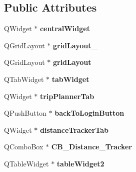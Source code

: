 \subsection*{Public Attributes}
\begin{DoxyCompactItemize}
\item 
\mbox{\label{class_ui___main_window_a30075506c2116c3ed4ff25e07ae75f81}} 
Q\+Widget $\ast$ {\bfseries central\+Widget}
\item 
\mbox{\label{class_ui___main_window_a6b2a0c5f7e8ff2a87134908dd770d2d2}} 
Q\+Grid\+Layout $\ast$ {\bfseries grid\+Layout\+\_}
\item 
\mbox{\label{class_ui___main_window_a525ed3c5fe0784ac502ee222fba4e205}} 
Q\+Grid\+Layout $\ast$ {\bfseries grid\+Layout}
\item 
\mbox{\label{class_ui___main_window_a3260b943854b841c986f47c4726ee7f9}} 
Q\+Tab\+Widget $\ast$ {\bfseries tab\+Widget}
\item 
\mbox{\label{class_ui___main_window_a89c881d7aacd60aca9053c00cb8d5c20}} 
Q\+Widget $\ast$ {\bfseries trip\+Planner\+Tab}
\item 
\mbox{\label{class_ui___main_window_aa5800f4d4be2cfb760f58ef468c53a1a}} 
Q\+Push\+Button $\ast$ {\bfseries back\+To\+Login\+Button}
\item 
\mbox{\label{class_ui___main_window_a9c2647e3ca1e759d9bfa1ff21e6acb1f}} 
Q\+Widget $\ast$ {\bfseries distance\+Tracker\+Tab}
\item 
\mbox{\label{class_ui___main_window_a22d4df181bec9dfed94facfe029c76f0}} 
Q\+Combo\+Box $\ast$ {\bfseries C\+B\+\_\+\+Distance\+\_\+\+Tracker}
\item 
\mbox{\label{class_ui___main_window_a2265350de498058d76a442c5446ca0dd}} 
Q\+Table\+Widget $\ast$ {\bfseries table\+Widget2}
\item 
\mbox{\label{class_ui___main_window_a61af9bb6c545f530d061e2b1a4e9d6f9}} 

\end{DoxyCompactItemize}
